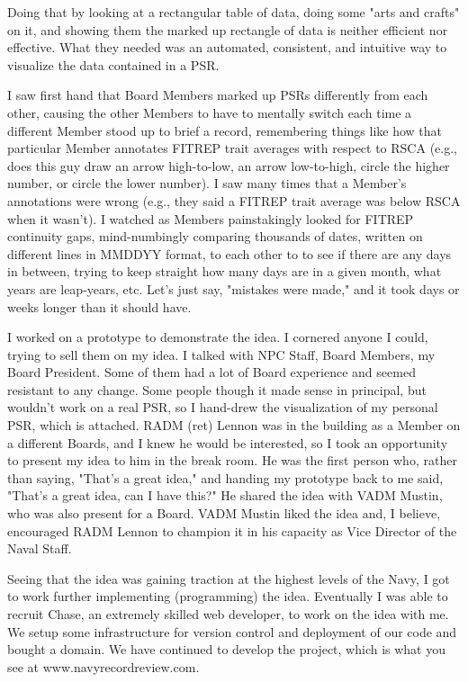 \documentclass[UTF8]{article}
\begin{document}
Doing that by looking at a rectangular table of data, doing some "arts and crafts" on it, and showing them the marked up rectangle of data is neither efficient nor effective. What they needed was an automated, consistent, and intuitive way to visualize the data contained in a PSR.

I saw first hand that Board Members marked up PSRs differently from each other, causing the other Members to have to mentally switch each time a different Member stood up to brief a record, remembering things like how that particular Member annotates FITREP trait averages with respect to RSCA (e.g., does this guy draw an arrow high-to-low, an arrow low-to-high, circle the higher number, or circle the lower number). I saw many times that a Member's annotations were wrong (e.g., they said a FITREP trait average was below RSCA when it wasn't). I watched as Members painstakingly looked for FITREP continuity gaps, mind-numbingly comparing thousands of dates, written on different lines in MMDDYY format, to each other to to see if there are any days in between, trying to keep straight how many days are in a given month, what years are leap-years, etc. Let's just say, "mistakes were made," and it took days or weeks longer than it should have.

I worked on a prototype to demonstrate the idea. I cornered anyone I could, trying to sell them on my idea. I talked with NPC Staff, Board Members, my Board President. Some of them had a lot of Board experience and seemed resistant to any change. Some people though it made sense in principal, but wouldn't work on a real PSR, so I hand-drew the visualization of my personal PSR, which is attached. RADM (ret) Lennon was in the building as a Member on a different Boards, and I knew he would be interested, so I took an opportunity to present my idea to him in the break room. He was the first person who, rather than saying, "That's a great idea," and handing my prototype back to me said, "That's a great idea, can I have this?" He shared the idea with VADM Mustin, who was also present for a Board. VADM Mustin liked the idea and, I believe, encouraged RADM Lennon to champion it in his capacity as Vice Director of the Naval Staff.

Seeing that the idea was gaining traction at the highest levels of the Navy, I got to work further implementing (programming) the idea. Eventually I was able to recruit Chase, an extremely skilled web developer, to work on the idea with me. We setup some infrastructure for version control and deployment of our code and bought a domain. We have continued to develop the project, which is what you see at www.navyrecordreview.com.
\end{document}
